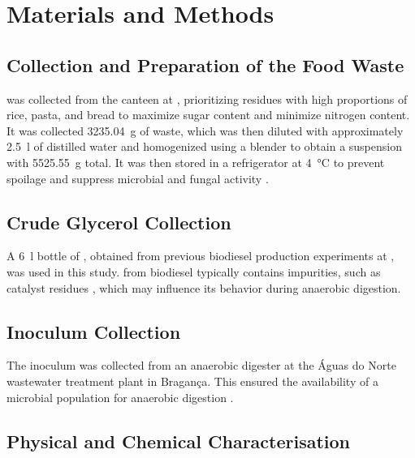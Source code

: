 \chapter{Materials and Methods}
\label{ch:materials_methods}

\section{Collection and Preparation of the Food Waste}
\label{sec:col_prep_FW}

 was collected from the canteen at , prioritizing residues with high proportions of rice, pasta, and bread to maximize sugar content and minimize nitrogen content. It was collected \qty[round-mode = places, round-precision = 0]{3235.04}{\gram} of waste, which was then diluted with approximately \qty{2.5}{\litre} of distilled water and homogenized using a blender to obtain a  suspension with \qty[round-mode = places, round-precision = 0]{5525.55}{\gram} total. It was then stored in a refrigerator at \qty{4}{\celsius} to prevent spoilage and suppress microbial and fungal activity \parencite{degueurce2020}.

\section{Crude Glycerol Collection}
\label{sec:gly_col}

A \qty{6}{\litre} bottle of , obtained from previous biodiesel production experiments at , was used in this study.  from biodiesel typically contains impurities, such as catalyst residues \parencite{attarbachi2023}, which may influence its behavior during anaerobic digestion.

\section{Inoculum Collection}
\label{sec:ino_col}

The inoculum was collected from an anaerobic digester at the Águas do Norte wastewater treatment plant in Bragança. This ensured the availability of a microbial population for anaerobic digestion \parencite{posmanik2020}.

\section{Physical and Chemical Characterisation}
\label{sec:phy_chem_char}

